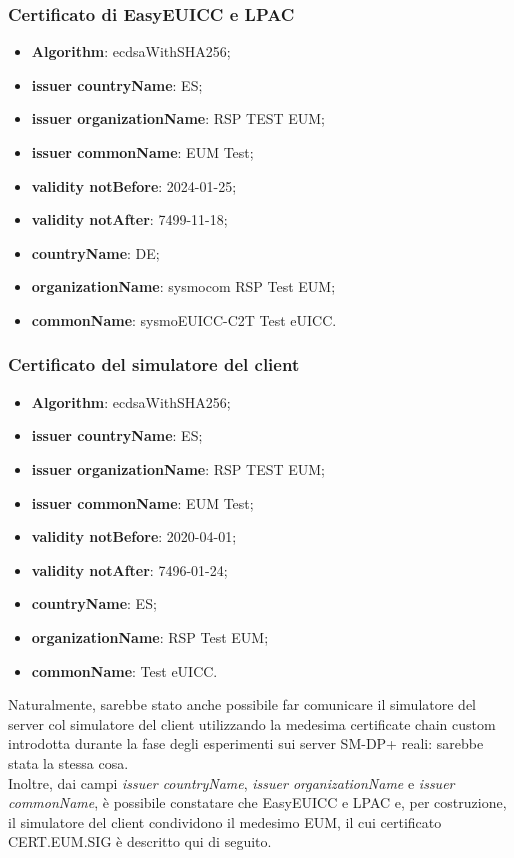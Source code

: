\documentclass[10pt, oneside]{book}
\begin{document}
\subsubsection{Certificato di EasyEUICC e LPAC}
\begin{itemize}
\item \textbf{Algorithm}: ecdsaWithSHA256;
\item \textbf{issuer countryName}: ES;
\item \textbf{issuer organizationName}: RSP TEST EUM;
\item \textbf{issuer commonName}: EUM Test;
\item \textbf{validity notBefore}: 2024-01-25;
\item \textbf{validity notAfter}: 7499-11-18;
\item \textbf{countryName}: DE;
\item \textbf{organizationName}: sysmocom RSP Test EUM;
\item \textbf{commonName}: sysmoEUICC-C2T Test eUICC.
\end{itemize}

\subsubsection{Certificato del simulatore del client}
\begin{itemize}
\item \textbf{Algorithm}: ecdsaWithSHA256;
\item \textbf{issuer countryName}: ES;
\item \textbf{issuer organizationName}: RSP TEST EUM;
\item \textbf{issuer commonName}: EUM Test;
\item \textbf{validity notBefore}: 2020-04-01;
\item \textbf{validity notAfter}: 7496-01-24;
\item \textbf{countryName}: ES;
\item \textbf{organizationName}: RSP Test EUM;
\item \textbf{commonName}: Test eUICC.
\end{itemize}

\noindent Naturalmente, sarebbe stato anche possibile far comunicare il simulatore del server col simulatore del client utilizzando la medesima certificate chain custom introdotta durante la fase degli esperimenti sui server SM-DP+ reali: sarebbe stata la stessa cosa.\\
Inoltre, dai campi \textit{issuer countryName}, \textit{issuer organizationName} e \textit{issuer commonName}, è possibile constatare che EasyEUICC e LPAC e, per costruzione, il simulatore del client condividono il medesimo EUM, il cui certificato CERT.EUM.SIG è descritto qui di seguito.
\end{document}
